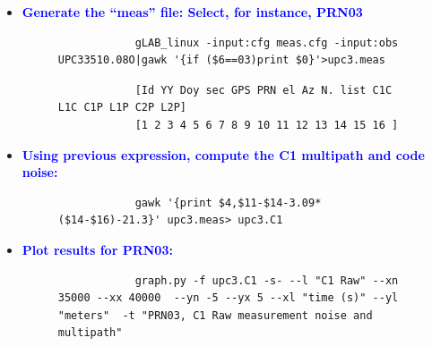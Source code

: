 \begin{itemize}
    \item \textbf{\textcolor{Blue}{Generate the “meas” file: Select, for instance, PRN03}}
    \begin{figure}[H]
            \centering
            \begin{verbatim}
            gLAB_linux -input:cfg meas.cfg -input:obs UPC33510.08O|gawk '{if ($6==03)print $0}'>upc3.meas
            \end{verbatim}
            \caption{}
            \label{}
    \end{figure}
    \begin{figure}[H]
            \centering
            \begin{verbatim}
            [Id YY Doy sec GPS PRN el Az N. list C1C L1C C1P L1P C2P L2P]
            [1 2 3 4 5 6 7 8 9 10 11 12 13 14 15 16 ]
            \end{verbatim}
            \caption{}
            \label{}
    \end{figure}

    
    \item \textbf{\textcolor{Blue}{Using previous expression, compute the C1 multipath and code noise:}}
    \begin{figure}[H]
            \centering
            \begin{verbatim}
            gawk '{print $4,$11-$14-3.09*($14-$16)-21.3}' upc3.meas> upc3.C1
            \end{verbatim}
            \caption{}
            \label{}
    \end{figure}


    
    \item \textbf{\textcolor{Blue}{Plot results for PRN03:}}
    \begin{figure}[H]
            \centering
            \begin{verbatim}
            graph.py -f upc3.C1 -s- --l "C1 Raw" --xn 35000 --xx 40000  --yn -5 --yx 5 --xl "time (s)" --yl "meters"  -t "PRN03, C1 Raw measurement noise and multipath"
            \end{verbatim}
            \caption{}
            \label{}
    \end{figure}
\end{itemize}




